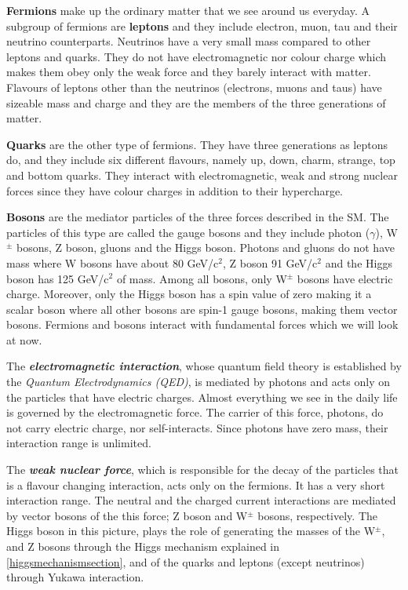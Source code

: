 \textbf{Fermions} make up the ordinary matter that we see around us everyday. A subgroup of fermions are \textbf{leptons} and they include electron, muon, tau and their neutrino counterparts. Neutrinos have a very small mass compared to other leptons and quarks. They do not have electromagnetic nor colour charge which makes them obey only the weak force and they barely interact with matter. Flavours of leptons other than the neutrinos (electrons, muons and taus) have sizeable mass and charge and they are the members of the three generations of matter.

\textbf{Quarks} are the other type of fermions. They have three generations as leptons do, and they include six different flavours, namely up, down, charm, strange, top and bottom quarks. They interact with electromagnetic, weak and strong nuclear forces since they have colour charges in addition to their hypercharge. 

\textbf{Bosons} are the mediator particles of the three forces described in the SM. The particles of this type are called the gauge bosons and they include photon ($\gamma$), W$^{\pm}$ bosons, Z boson, gluons and the Higgs boson. Photons and gluons do not have mass where W bosons have about 80 GeV/c$^{2}$, Z boson 91 GeV/c$^{2}$ and the Higgs boson has 125 GeV/c$^{2}$ of mass. Among all bosons, only W$^{\pm}$ bosons have electric charge. Moreover, only the Higgs boson has a spin value of zero making it a scalar boson where all other bosons are spin-1 gauge bosons, making them vector bosons. Fermions and bosons interact with fundamental forces which we will look at now.

The \textit{\textbf{electromagnetic interaction}}, whose quantum field theory is established by the \emph{Quantum Electrodynamics (QED)}, is mediated by photons and acts only on the particles that have electric charges.  Almost everything we see in the daily life is governed by the electromagnetic force. The carrier of this force, photons, do not carry electric charge, nor self-interacts. Since photons have zero mass, their interaction range is unlimited.

The \emph{\textbf{weak nuclear force}}, which is responsible for the decay of the particles that is a flavour changing interaction, acts only on the fermions. It has a very short interaction range. The neutral and the charged current interactions are mediated by vector bosons of the this force; Z boson and W$^{\pm}$ bosons, respectively. The Higgs boson in this picture, plays the role of generating the masses of the W$^{\pm}$, and Z bosons through the Higgs mechanism explained in \autoref{higgsmechanismsection}, and of the quarks and leptons (except neutrinos) through Yukawa interaction\cite{Weinberg1967}.

